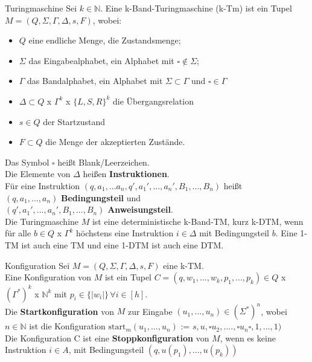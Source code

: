 \begin{defn}{Turingmaschine} 
    Sei $k \in \mathbb{N}$. Eine k-Band-Turingmaschine (k-Tm) ist ein Tupel $M = (Q, \Sigma, \Gamma, \Delta,s,F)$, wobei:
    \begin{itemize}
        \item $Q$ eine endliche Menge, die Zustandsmenge;
        \item $\Sigma$ das Eingabealphabet, ein Alphabet mit $\square \notin \Sigma$;
        \item $\Gamma$ das Bandalphabet, ein Alphabet mit $\Sigma \subset \Gamma$ und $\square \in \Gamma$
        \item $\Delta \subset Q$ x $\Gamma^k$ x $\{L,S,R\}^k$ die Übergangsrelation
        \item $s \in Q$ der Startzustand
        \item $F \subset Q$ die Menge der akzeptierten Zustände.
    \end{itemize}

    \vspace{1em}

    Das Symbol $\square$ heißt Blank/Leerzeichen. \\

    Die Elemente von $\Delta$ heißen \textbf{Instruktionen}. \\
    Für eine Instruktion $(q,a_1,...a_n,q',a_1',...,a_n',B_1,...,B_n)$ heißt \\
    $(q,a_1,...,a_n)$ \textbf{Bedingungsteil} und \\
    $(q',a_1',...,a_n',B_1,...,B_n)$ \textbf{Anweisungsteil}. \\

    Die Turingmaschine $M$ ist eine deterministische k-Band-TM, kurz k-DTM, wenn für alle $b \in Q$ x $\Gamma^k$ höchstens eine Instruktion $i \in \Delta$ mit Bedingungsteil $b$.
    Eine 1-TM ist auch eine TM und eine 1-DTM ist auch eine DTM.
\end{defn}

\begin{defn}{Konfiguration}
    Sei $M = (Q, \Sigma, \Gamma, \Delta, s, F)$ eine k-TM. \\

    Eine Konfiguration von $M$ ist ein Tupel $C = (q,w_1,...,w_k,p_1,...,p_k) \in Q$ x $(\Gamma^*)^k$ x $\mathbb{N}^k$ mit $p_i \in \{| w_i |\} \, \forall i \in [h]$. \\

    Die \textbf{Startkonfiguration} von $M$ zur Eingabe $(u_1,...,u_n)\in(\Sigma^*)^n$, wobei $n\in\mathbb{N}$ ist die Konfiguration $\text{start}_m(u_1,...,u_n)$ := $s, u,\square u_2,....,\square u_n \square, 1,...,1)$ \\

    Die Konfiguration C ist eine \textbf{Stoppkonfiguration} von $M$, wenn es keine Instruktion $i \in A$, mit Bedingungsteil $(q, u(p_1),...,u(p_k))$
\end{defn}

